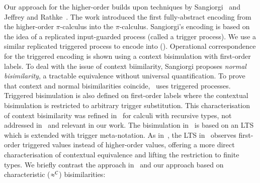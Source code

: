 Our approach for the higher-order builds upon techniques by Sangiorgi~\cite{SangiorgiD:expmpa,San96H}
and Jeffrey and Rathke~\cite{JeffreyR05}.
The work %
\cite{SangiorgiD:expmpa}
introduced the first fully-abstract encoding from the higher-order 
$\pi$-calculus into the $\pi$-calculus. 
Sangiorgi's encoding is based on the idea of a replicated input-guarded process 
(called a trigger process). We use a similar 
replicated triggered process 
to encode \HOp into \sessp ().
 Operational correspondence for
the triggered encoding is shown using a context bisimulation
with first-order labels.
To deal with the issue of context biimilarity, 
Sangiorgi proposes \emph{normal bisimilarity}, 
a tractable  equivalence without universal quantification. 
To prove that context and normal bisimilarities coincide,~\cite{SangiorgiD:expmpa} uses 
triggered processes.
Triggered bisimulation is also defined on first-order labels
where the contextual bisimulation is restricted to arbitrary
trigger substitution. %
This
characterisation of context bisimilarity  was refined in~\cite{JeffreyR05} for
calculi with recursive types, not addressed in~\cite{San96H,SangiorgiD:expmpa} and
relevant in our work.
The
bisimulation in~\cite{JeffreyR05}
is based on an LTS which is extended with trigger meta-notation.
As in~\cite{San96H,SangiorgiD:expmpa}, 
the LTS in~\cite{JeffreyR05}
observes first-order triggered values instead of
higher-order values, offering a more direct characterisation of contextual equivalence
and lifting the restriction to finite types.
We briefly contrast 
the approach in~\cite{JeffreyR05} and our approach based on 
 characteristic ($\approx^C$) bisimilarities:
